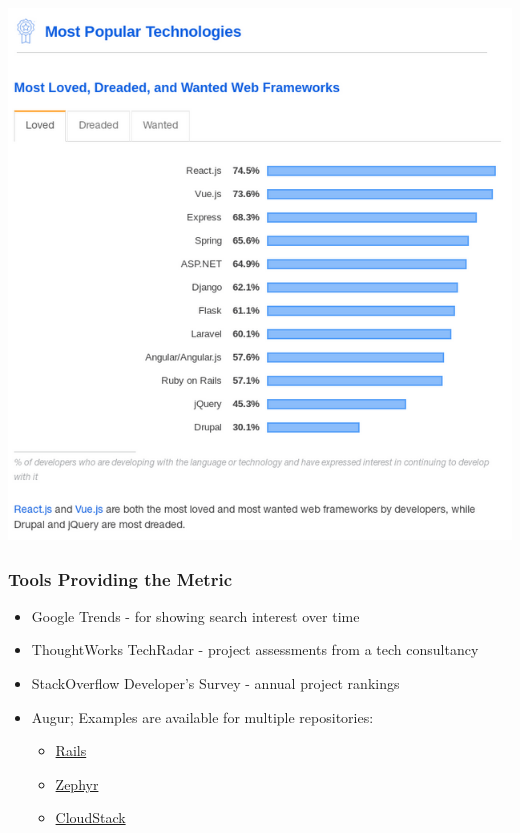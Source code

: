 \includegraphics{images/organizational-project-skill-demand_stack-overflow.png}

\hypertarget{tools-providing-the-metric}{%
\subsubsection{Tools Providing the
Metric}\label{tools-providing-the-metric}}

\begin{itemize}
\tightlist
\item
  Google Trends - for showing search interest over time
\item
  ThoughtWorks TechRadar - project assessments from a tech consultancy
\item
  StackOverflow Developer's Survey - annual project rankings
\item
  Augur; Examples are available for multiple repositories:

  \begin{itemize}
  \tightlist
  \item
    \href{http://augur.osshealth.io/repo/Rails\%20(wg-value)/rails/overview}{Rails}
  \item
    \href{http://augur.osshealth.io/repo/Zephyr-RTOS/zephyr/overview}{Zephyr}
  \item
    \href{http://augur.osshealth.io/repo/Apache\%20(wg-value)/cloudstack/overview}{CloudStack}
  \end{itemize}
\end{itemize}

